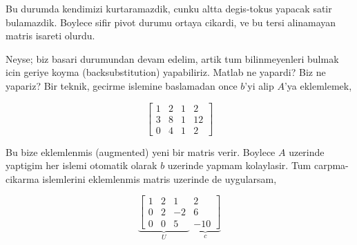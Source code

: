 \documentclass[12pt,fleqn]{article}\usepackage{../common}
\begin{document}
Bu durumda kendimizi kurtaramazdik, cunku altta degis-tokus yapacak satir
bulamazdik. Boylece sifir pivot durumu ortaya cikardi, ve bu tersi
alinamayan matris isareti olurdu.

Neyse; biz basari durumundan devam edelim, artik tum bilinmeyenleri bulmak
icin geriye koyma (backsubstitution) yapabiliriz. Matlab ne yapardi? Biz ne
yapariz? Bir teknik, gecirme islemine baslamadan once $b$'yi alip $A$'ya
eklemlemek, 

$$ 
\left[\begin{array}{rrrr}
1 & 2 & 1 & 2\\
3 & 8 & 1 & 12 \\
0 & 4 & 1 & 2
\end{array}\right]
 $$

Bu bize eklemlenmis (augmented) yeni bir matris verir. Boylece $A$
uzerinde yaptigim her islemi otomatik olarak $b$ uzerinde yapmam
kolaylasir. Tum carpma-cikarma islemlerini eklemlenmis matris uzerinde de
uygularsam,

$$ 
\underbrace{
\left[\begin{array}{rrr}
1 & 2 & 1 \\
0 & 2 & -2 \\
0 & 0 & 5  
\end{array}\right.}_{U}
\underbrace{
\left. \begin{array}{r}
 2\\
 6\\
 -10 
\end{array}\right]}_{c}
 $$
\end{document}
